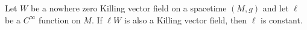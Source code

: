 Let $W$ be a nowhere zero Killing vector field on a spacetime $(M, g)$ and let $\ell$ be a $C^\infty$ function on $M$. If $\ell W$ is also a Killing vector field, then $\ell$ is constant.
